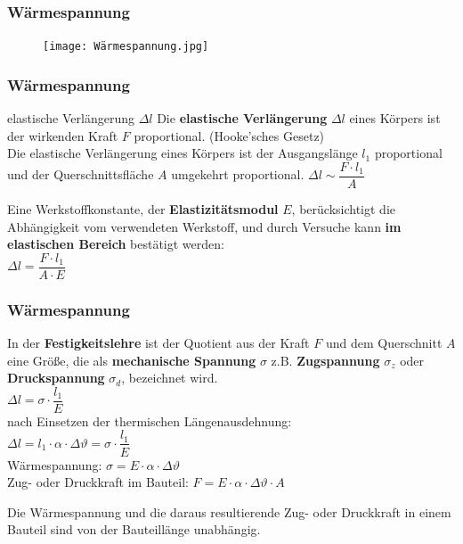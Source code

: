 \documentclass{beamer}
\begin{document}
\frame
{
\frametitle{Wärmespannung}
\begin{figure}
	\texttt{[image: Wärmespannung.jpg]}
\end{figure}
}

\frame
{
\frametitle{Wärmespannung}
	\begin{block}{elastische Verlängerung $\Delta l$}
	Die \textbf{elastische Verlängerung} $\Delta l$ eines Körpers ist der wirkenden Kraft $F$ proportional. (Hooke'sches Gesetz)\\
	Die elastische Verlängerung eines Körpers ist der Ausgangslänge $l_1$ proportional und der Querschnittsfläche $A$ umgekehrt proportional.
	$\Delta l\sim\dfrac{F\cdot l_1}{A}$
	\end{block}
	Eine Werkstoffkonstante, der \textbf{Elastizitätsmodul} $E$, berücksichtigt die Abhängigkeit vom verwendeten Werkstoff, und durch Versuche kann \textbf{im elastischen Bereich} bestätigt werden:\\
	$\Delta l=\dfrac{F\cdot l_1}{A\cdot E}$
}	
\frame
{
\frametitle{Wärmespannung}
	In der \textbf{Festigkeitslehre} ist der Quotient aus der Kraft $F$ und dem Querschnitt $A$ eine Größe, die als \textbf{mechanische Spannung} $\sigma$ z.B. \textbf{Zugspannung} $\sigma_z$ oder \textbf{Druckspannung} $\sigma_d$, bezeichnet wird.\\
	$\Delta l=\sigma\cdot\dfrac{l_1}{E}$\\
	nach Einsetzen der thermischen Längenausdehnung:\\
	$\Delta l=l_1\cdot\alpha\cdot\Delta\vartheta=\sigma\cdot\dfrac{l_1}{E}$\\
	Wärmespannung: $\sigma=E\cdot\alpha\cdot\Delta\vartheta$\\
	Zug- oder Druckkraft im Bauteil: $F=E\cdot\alpha\cdot\Delta\vartheta\cdot A$\\
	\begin{block}{}
	Die Wärmespannung und die daraus resultierende Zug- oder Druckkraft in einem Bauteil sind von der Bauteillänge unabhängig.
	\end{block}
}
\end{document}
